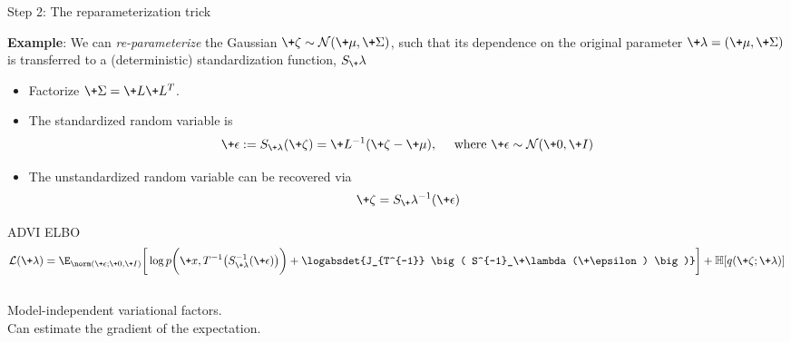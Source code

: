 \documentclass[10pt]{beamer}
\begin{document}
\begin{frame}{Step 2: The reparameterization trick}
	
\textbf{Example}: We can \textit{re-parameterize} the Gaussian $\+\zeta \sim \mathcal{N}(\+\mu, \+\Sigma)$, such that its dependence on the original parameter $\+\lambda = (\+\mu, \+\Sigma)$ is transferred to a (deterministic) standardization function, $S_\+\lambda$ 

\begin{itemize}
\item Factorize $\+\Sigma=\+L\+L^T$. 
\item The standardized random variable is 
\[ \+\epsilon := S_{\+\lambda} (\+\zeta) = \+L^{-1} (\+\zeta - \+\mu), \quad \text{ where } \+\epsilon \sim \mathcal{N}(\+0, \+I)\]  
\item The unstandardized random variable can be recovered via
\[ \+\zeta = S_\+\lambda^{-1}(\+\epsilon)\]
\end{itemize}

\begin{block}{\textsc{ADVI ELBO}}
\scriptsize
\[ \mathcal{L}(\+\lambda) = \E_{\norm (\+\epsilon; \+0, \+I)}  \bigg[ 
	\log p \bigg( \+x, T^{-1} \big( S^{-1}_{\+\lambda} (\+\epsilon) \big) \bigg) + \logabsdet{J_{T^{-1}} \big( S^{-1}_\+\lambda (\+\epsilon) \big)}  \bigg]  + \mathbb{H} [q(\+\zeta ; \+\lambda )] \] 
\normalsize
\end{block}

\pause
\vspace{.1in}
\begin{columns}
\small 
\greencheck Model-independent variational factors. \\
\small
\greencheck Can estimate the gradient of the expectation.\\
\end{columns}
	 	
	 	
\end{frame}
\end{document}
